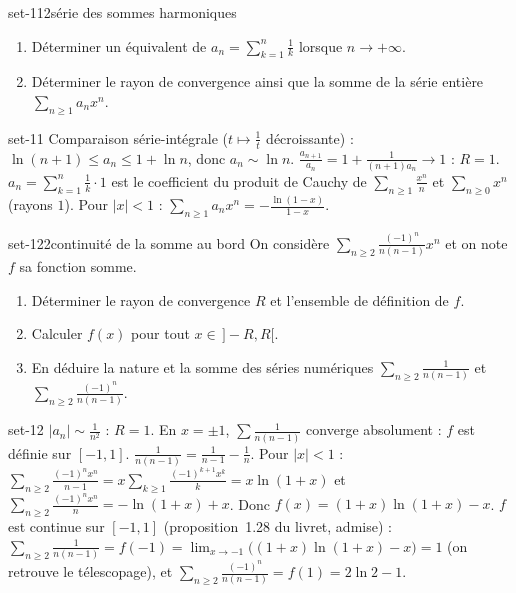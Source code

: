 \begin{exo}{set-11}{2}{série des sommes harmoniques}
\begin{enumerate}
\item Déterminer un équivalent de $a_n=\sum_{k=1}^n\frac1k$ lorsque $n\to+\infty$.
\item Déterminer le rayon de convergence ainsi que la somme de la série entière $\sum_{n\geq1}a_nx^n$.
\end{enumerate}
\end{exo}

\begin{corrige}{set-11}
 Comparaison série-intégrale ($t\mapsto\frac1t$ décroissante) : $\ln(n+1)\leq a_n\leq1+\ln n$, donc $a_n\sim\ln n$.
 $\frac{a_{n+1}}{a_n}=1+\frac1{(n+1)a_n}\to1$ : $R=1$. $a_n=\sum_{k=1}^n\frac1k\cdot1$ est le coefficient du produit de Cauchy de $\sum_{n\geq1}\frac{x^n}n$ et
$\sum_{n\geq0}x^n$ (rayons $1$). Pour $|x|<1$ : $\sum_{n\geq1}a_nx^n=-\frac{\ln(1-x)}{1-x}$.
\end{corrige}

\begin{exo}{set-12}{2}{continuité de la somme au bord}
On considère $\sum_{n\geq2}\frac{(-1)^n}{n(n-1)}x^n$ et on note $f$ sa fonction somme.
\begin{enumerate}
\item Déterminer le rayon de convergence $R$ et l'ensemble de définition de $f$.
\item Calculer $f(x)$ pour tout $x\in\,]-R,R[$.
\item En déduire la nature et la somme des séries numériques $\sum_{n\geq2}\frac1{n(n-1)}$ et $\sum_{n\geq2}\frac{(-1)^n}{n(n-1)}$.
\end{enumerate}
\end{exo}

\begin{corrige}{set-12}
 $|a_n|\sim\frac1{n^2}$ : $R=1$. En $x=\pm1$, $\sum\frac1{n(n-1)}$ converge absolument : $f$ est définie sur $[-1,1]$.
 $\frac1{n(n-1)}=\frac1{n-1}-\frac1n$. Pour $|x|<1$ : $\sum_{n\geq2}\frac{(-1)^nx^n}{n-1}=x\sum_{k\geq1}\frac{(-1)^{k+1}x^k}k=x\ln(1+x)$ et
$\sum_{n\geq2}\frac{(-1)^nx^n}n=-\ln(1+x)+x$. Donc $f(x)=(1+x)\ln(1+x)-x$.
 $f$ est continue sur $[-1,1]$ (proposition~1.28 du livret, admise) :
$\sum_{n\geq2}\frac1{n(n-1)}=f(-1)=\lim_{x\to-1}\big((1+x)\ln(1+x)-x\big)=1$ (on retrouve le télescopage), et $\sum_{n\geq2}\frac{(-1)^n}{n(n-1)}=f(1)=2\ln2-1$.
\end{corrige}

